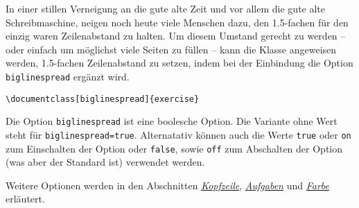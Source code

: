\documentclass{exercise}
\begin{document}
    In einer stillen Verneigung an die gute alte Zeit und vor allem die gute
    alte Schreibmaschine, neigen noch heute viele Menschen dazu, den 1.5-fachen
    für den einzig waren Zeilenabstand zu halten. Um diesem Umstand gerecht zu
    werden -- oder einfach um möglichst viele Seiten zu füllen -- kann die
    Klasse angeweisen werden, 1.5-fachen Zeilenabstand zu setzen, indem bei
    der Einbindung die Option \lstinline{biglinespread} ergänzt wird.
    \begin{lstlisting}[gobble=6]
      \documentclass[biglinespread]{exercise}
    \end{lstlisting}

    Die Option \lstinline{biglinespread} ist eine boolesche Option. Die Variante
    ohne Wert steht für \lstinline{biglinespread=true}. Alternatativ können auch die
    Werte \lstinline{true} oder \lstinline{on} zum Einschalten der Option oder
    \lstinline{false}, sowie \lstinline{off} zum Abschalten der Option (was aber der
    Standard ist) verwendet werden.

    Weitere Optionen werden in den Abschnitten
    \emph{\hyperref[section-kopfzeile]{Kopfzeile}},
    \emph{\hyperref[section-aufgaben]{Aufgaben}} und
    \emph{\hyperref[section-farbe]{Farbe}} erläutert.
\end{document}
